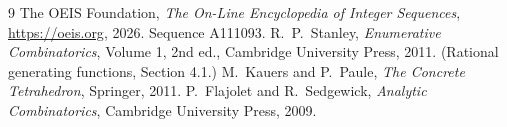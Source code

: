 \documentclass[11pt,a4paper]{article}
\theoremstyle{plain}
\theoremstyle{definition}
\begin{document}
\begin{thebibliography}{9}
 The OEIS Foundation, \emph{The On-Line Encyclopedia of Integer
Sequences}, \url{https://oeis.org}, 2026. Sequence A111093.
 R.~P.~Stanley, \emph{Enumerative Combinatorics}, Volume 1, 2nd ed.,
Cambridge University Press, 2011. (Rational generating functions, Section 4.1.)
 M.~Kauers and P.~Paule, \emph{The Concrete Tetrahedron}, Springer, 2011.
 P.~Flajolet and R.~Sedgewick, \emph{Analytic Combinatorics}, Cambridge
University Press, 2009.
\end{thebibliography}
\end{document}
